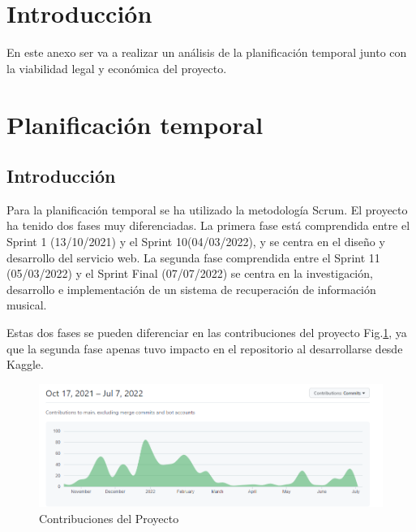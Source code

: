 
\section{Introducción}
En este anexo ser va a realizar un análisis de la planificación temporal junto con la viabilidad legal y económica del proyecto. 

\section{Planificación temporal}
\subsection{Introducción}
Para la planificación temporal se ha utilizado la metodología Scrum. El proyecto ha tenido dos fases muy diferenciadas. La primera fase está comprendida entre el Sprint 1 (13/10/2021) y el Sprint 10(04/03/2022), y se centra en el diseño y desarrollo del servicio web. La segunda fase comprendida entre el Sprint 11 (05/03/2022) y el Sprint Final (07/07/2022) se centra en la investigación, desarrollo e implementación de un sistema de recuperación de información musical. 

Estas dos fases se pueden diferenciar en las contribuciones del proyecto Fig.\ref{fig:A:contribuciones_del_proyecto}, ya que la segunda fase apenas tuvo impacto en el repositorio al desarrollarse desde Kaggle. 

\begin{figure}
    \centering
    \includegraphics[width=\textwidth]{img/A/contribuciones.png}
    \caption{Contribuciones del Proyecto}
    \label{fig:A:contribuciones_del_proyecto}
\end{figure}

